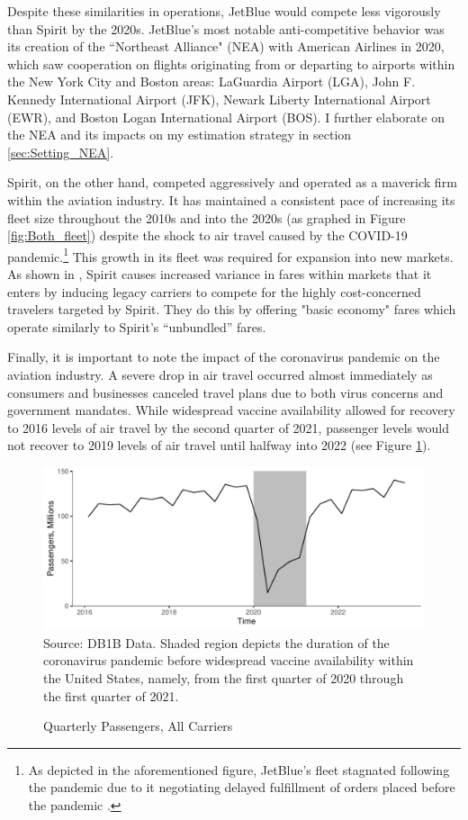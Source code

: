 \documentclass{article}
\begin{document}
    
	Despite these similarities in operations, JetBlue would compete less vigorously than Spirit by the 2020s.  JetBlue's most notable anti-competitive behavior was its creation of the ``Northeast Alliance" (NEA) with American Airlines in 2020, which saw cooperation on flights originating from or departing to airports within the New York City and Boston areas: LaGuardia Airport (LGA), John F. Kennedy International Airport (JFK), Newark Liberty International Airport (EWR), and Boston Logan International Airport (BOS). I further elaborate on the NEA and its impacts on my estimation strategy in section \ref{sec:Setting_NEA}.
	
	Spirit, on the other hand, competed aggressively and operated as  a maverick firm within the aviation industry. It has maintained a consistent pace of increasing its fleet size throughout the 2010s and into the 2020s (as graphed in Figure \ref{fig:Both_fleet}) despite the shock to air travel caused by the COVID-19 pandemic.\footnote{As depicted in the aforementioned figure, JetBlue's fleet stagnated following the pandemic due to it negotiating delayed fulfillment of orders placed before the pandemic \citep{bellamy_iii_jetblue_2020, sipinski_jetblue_2020}.} This growth in its fleet was required for expansion into new markets. As shown in \citet{shrago_spirit_2024}, Spirit causes increased variance in fares within markets that it enters by inducing legacy carriers to compete for the highly cost-concerned travelers targeted by Spirit. They do this by offering "basic economy" fares which operate similarly to Spirit's ``unbundled'' fares.
	
	Finally, it is important to note the impact of the coronavirus pandemic on the aviation industry.  A severe drop in air travel occurred almost immediately as consumers and businesses canceled travel plans due to both virus concerns and government mandates. While widespread vaccine availability allowed for recovery to 2016 levels of air travel by the second quarter of 2021, passenger levels would not recover to 2019 levels of air travel until halfway into 2022 (see Figure \ref{fig:QuarterlyPass}). 

\begin{figure}
	\caption{Quarterly Passengers, All Carriers}
	\label{fig:QuarterlyPass}
	\includegraphics[width = \linewidth]{Quarterly_DB1B_Itineraries}
	\footnotesize{Source: DB1B Data. Shaded region depicts the duration of the coronavirus pandemic before widespread vaccine availability within the United States, namely, from the first quarter of 2020 through the first quarter of 2021.}
\end{figure}
    
\end{document}
